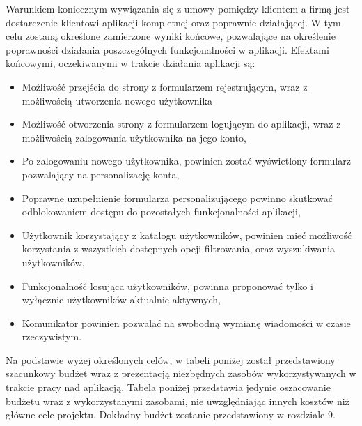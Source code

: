 \documentclass[12pt,a4paper]{article}
\begin{document}
Warunkiem koniecznym wywiązania się z umowy pomiędzy klientem a firmą jest dostarczenie klientowi aplikacji kompletnej oraz poprawnie działającej. W tym celu zostaną określone zamierzone wyniki końcowe, pozwalające na określenie poprawności działania poszczególnych funkcjonalności w aplikacji. Efektami końcowymi, oczekiwanymi w trakcie działania aplikacji są: 
\begin{itemize}
    \item Możliwość przejścia do strony z formularzem rejestrującym, wraz z możliwością utworzenia nowego użytkownika
    \item Możliwość otworzenia strony z formularzem logującym do aplikacji, wraz z możliwością zalogowania użytkownika na jego konto,
    \item Po zalogowaniu nowego użytkownika, powinien zostać wyświetlony formularz pozwalający na personalizację konta, 
    \item Poprawne uzupełnienie formularza personalizującego powinno skutkować odblokowaniem dostępu do pozostałych funkcjonalności aplikacji,
    \item Użytkownik korzystający z katalogu użytkowników, powinien mieć możliwość korzystania z wszystkich dostępnych opcji filtrowania, oraz wyszukiwania użytkowników, 
    \item Funkcjonalność losująca użytkowników, powinna proponować tylko i wyłącznie użytkowników aktualnie aktywnych, 
    \item Komunikator powinien pozwalać na swobodną wymianę wiadomości w czasie rzeczywistym.
\end{itemize}

Na podstawie wyżej określonych celów, w tabeli poniżej został przedstawiony szacunkowy budżet wraz z prezentacją niezbędnych zasobów wykorzystywanych w trakcie pracy nad aplikacją. Tabela poniżej przedstawia jedynie oszacowanie budżetu wraz z wykorzystanymi zasobami, nie uwzględniając innych kosztów niż główne cele projektu. Dokładny budżet zostanie przedstawiony w rozdziale 9.
\end{document}
